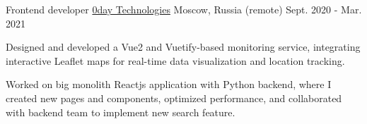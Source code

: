 \begin{cventries}
 \cventry
    {Frontend developer} %
    {\href{https://0day.llc/}{0day Technologies}}
    {Moscow, Russia (remote)} %
    {Sept. 2020 - Mar. 2021} %
    {
      \begin{cvitems} %
        \item {Designed and developed a Vue2 and Vuetify-based monitoring service, integrating interactive Leaflet maps for real-time data visualization and location tracking.}
        \item {Worked on big monolith Reactjs application with Python backend,
        where I created new pages and components, optimized performance, and collaborated with backend team to implement new search feature.}
      \end{cvitems}
    }
    {\vspace{16pt}}

\end{cventries}
